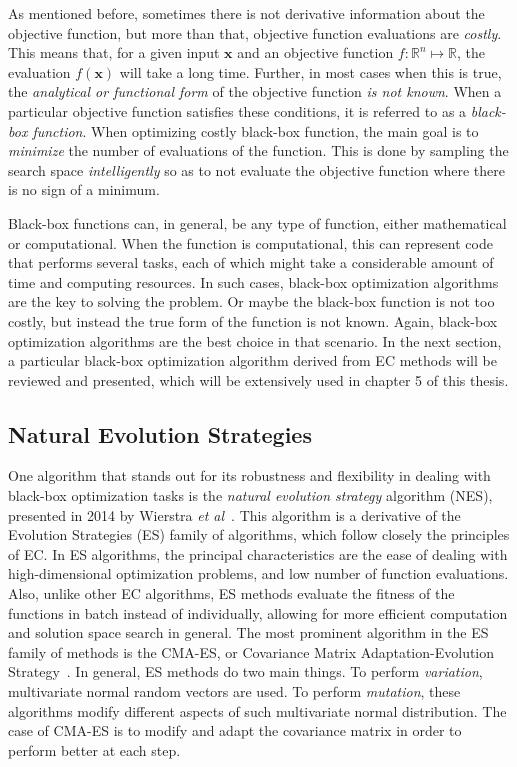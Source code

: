 As mentioned before, sometimes there is not derivative information about the objective 
function, but more than that, objective function evaluations are \emph{costly}. This means 
that, for a given input \(\bm{x}\) and an objective function \(f \colon \mathbb{R}^n \mapsto \mathbb{R}\), the evaluation \(f(\bm{x})\) will take a long time. Further, in 
most cases when this is true, the \emph{analytical or functional form} of the objective 
function \emph{is not known}. When a particular objective function satisfies these 
conditions, it is referred to as a \emph{black-box function}. When optimizing costly 
black-box function, the main goal is to \emph{minimize} the number of evaluations of the 
function. This is done by sampling the search space \emph{intelligently} so as to not 
evaluate the objective function where there is no sign of a minimum.

Black-box functions can, in general, be any type of function, either mathematical or 
computational. When the function is computational, this can represent code that performs 
several tasks, each of which might take a considerable amount of time and computing 
resources. In such cases, black-box optimization algorithms are the key to solving the 
problem. Or maybe the black-box function is not too costly, but instead the true form of 
the function is not known. Again, black-box optimization algorithms are the best choice
in that scenario. In the next section, a particular black-box optimization algorithm 
derived from EC methods will be reviewed and presented, which will be extensively used in 
chapter 5 of this thesis.

\subsection{Natural Evolution Strategies}
One algorithm that stands out for its robustness and flexibility in dealing with black-box 
optimization tasks is the \emph{natural evolution strategy} algorithm (NES), presented in 
2014 by Wierstra \emph{et al}~\cite{wierstraNaturalEvolutionStrategies2014a}. This 
algorithm is a derivative of the Evolution Strategies (ES) family of algorithms, which 
follow closely the principles of EC. In ES algorithms, the principal characteristics are 
the ease of dealing with high-dimensional optimization problems, and low number of function 
evaluations. Also, unlike other EC algorithms, ES methods evaluate the fitness of the 
functions in batch instead of individually, allowing for more efficient computation and 
solution space search in general. The most prominent algorithm in the ES family of methods 
is the CMA-ES, or Covariance Matrix Adaptation-Evolution 
Strategy~\cite{hansenCMAEvolutionStrategy2006}.
In general, ES methods do two main things. To perform \emph{variation}, multivariate normal 
random vectors are used. To perform \emph{mutation}, these algorithms modify different 
aspects of such multivariate normal distribution. The case of CMA-ES is to modify and adapt 
the covariance matrix in order to perform better at each step.

